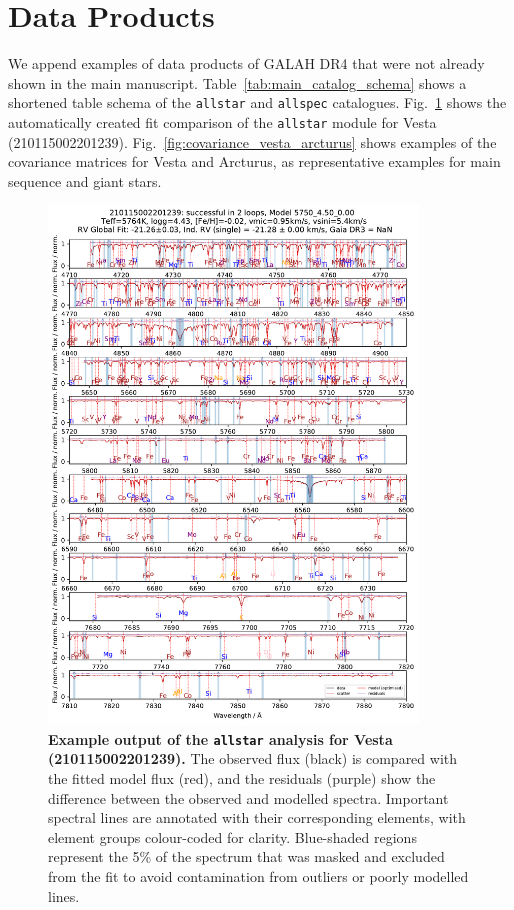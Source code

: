 \documentclass[
  journal=pasa,
  manuscript=research-paper, %
  year=2024,
  volume=37
]{cup-journal}
\begin{document}
\section{Data Products}

We append examples of data products of GALAH DR4 that were not already shown in the main manuscript. Table~\ref{tab:main_catalog_schema} shows a shortened table schema of the \texttt{allstar} and \texttt{allspec} catalogues. Fig.~\ref{fig:210115002201239_allstar_fit_comparison} shows the automatically created fit comparison of the \texttt{allstar} module for Vesta (210115002201239). Fig.~\ref{fig:covariance_vesta_arcturus} shows examples of the covariance matrices for Vesta and Arcturus, as representative examples for main sequence and giant stars.



\begin{figure}[ht]
 \centering
 \includegraphics[width=0.875\textwidth]{figures/210115002201239_allstar_fit_comparison.pdf} \caption{\textbf{ Example output of the \texttt{allstar} analysis for Vesta (210115002201239).} The observed flux (black) is compared with the fitted model flux (red), and the residuals (purple) show the difference between the observed and modelled spectra. Important spectral lines are annotated with their corresponding elements, with element groups colour-coded for clarity. Blue-shaded regions represent the 5\% of the spectrum that was masked and excluded from the fit to avoid contamination from outliers or poorly modelled lines.}
\label{fig:210115002201239_allstar_fit_comparison}
\end{figure}
\end{document}
